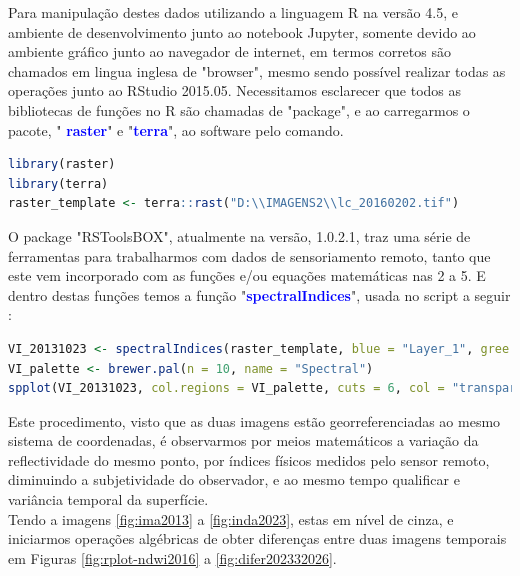 %
 \hspace*{1.25 cm} Para manipulação destes dados utilizando a linguagem R na versão 4.5, e ambiente de desenvolvimento junto ao notebook Jupyter, somente devido ao ambiente gráfico junto ao navegador de internet, em termos corretos são chamados em lingua inglesa de "browser", mesmo sendo possível realizar todas as operações junto ao RStudio 2015.05. Necessitamos esclarecer que  todos as bibliotecas de funções no R são chamadas de "package", e ao carregarmos o pacote, " \textbf{\textcolor{blue}{raster}}" e "\textbf{\textcolor{blue}{terra}}", ao software pelo comando.
   \lstset{
 	language=R, %
 	caption=Código para carregar imagens   em linguagem R,} %
\begin{lstlisting}[language=R]
library(raster)
library(terra)
raster_template <- terra::rast("D:\\IMAGENS2\\lc_20160202.tif")	   
\end{lstlisting} 
 \hspace*{1.25 cm} O package "RSToolsBOX", atualmente na versão, 1.0.2.1, traz uma série de ferramentas para trabalharmos com dados de sensoriamento remoto, tanto que este vem incorporado com as funções e/ou equações matemáticas nas 2 a 5. E dentro destas funções temos a função  "\textbf{\textcolor{blue}{spectralIndices}}", usada no script a seguir :
%
   \lstset{
	language=R, %
	caption=Código para obter índices  em linguagem R,} %
\begin{lstlisting}[language=R]
VI_20131023 <- spectralIndices(raster_template, blue = "Layer_1", gree = "Layer_2" ,red = "Layer_3", nir = "Layer_4",swir2 =  "Layer_5", indices = c("NDVI", "NDWI","EVI2", "MSAVI") 
VI_palette <- brewer.pal(n = 10, name = "Spectral")
spplot(VI_20131023, col.regions = VI_palette, cuts = 6, col = "transparente")
\end{lstlisting} 
%
 \hspace*{1.25 cm} Este procedimento, visto que as duas imagens estão georreferenciadas ao mesmo sistema  de coordenadas, é observarmos por meios matemáticos a variação da reflectividade do mesmo ponto, por índices físicos medidos pelo sensor remoto, diminuindo a subjetividade do observador, e ao mesmo tempo qualificar e variância temporal da superfície.\\
 \hspace*{1.25 cm} Tendo a imagens \ref{fig:ima2013} a  \ref{fig:inda2023}, estas em nível de cinza, e iniciarmos operações algébricas de obter diferenças entre duas imagens temporais em Figuras \ref{fig:rplot-ndwi2016} a \ref{fig:difer202332026}. \\
